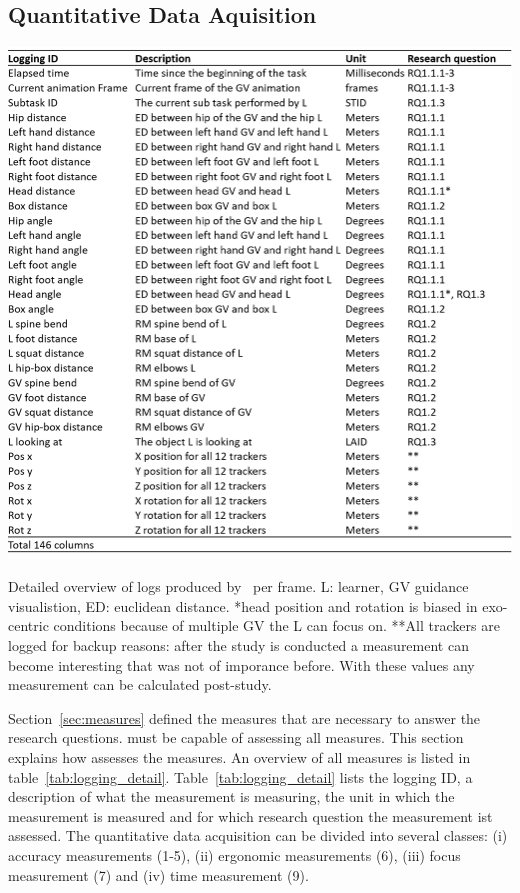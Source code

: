 \subsection{Quantitative Data Aquisition}
\label{sec:logging}
\begin{table}[H]
	\centering
	\includegraphics[width=\textwidth]{figures/logging_detail.png}
	\caption[logging detail]{Detailed overview of logs produced by \exgo\ per frame. L: learner, GV guidance visualistion, ED: euclidean distance. *head position and rotation is biased in exo-centric conditions because of multiple GV the L can focus on. **All trackers are logged for backup reasons: after the study is conducted a measurement can become interesting that was not of imporance before. With these values any measurement can be calculated post-study.}
	\label{fig:logging_detail}
\end{table}


Section~\ref{sec:measures} defined the measures that are necessary to answer the research questions. \exgo must be capable of assessing all measures. This section explains how \exgo assesses the measures. An overview of all measures is listed in table~\ref{tab:logging_detail}. Table~\ref{tab:logging_detail} lists the logging ID, a description of what the measurement is measuring, the unit in which the measurement is measured and for which research question the measurement ist assessed. The quantitative data acquisition can be divided into several classes: (i) accuracy measurements (1-5), (ii) ergonomic measurements (6), (iii) focus measurement (7) and (iv) time measurement (9). 

